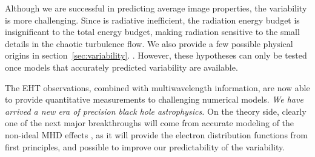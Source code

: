 Although we are successful in predicting average image properties, the
variability is more challenging.
Since \sgra is radiative inefficient, the radiation energy budget is
insignificant to the total energy budget, making radiation sensitive
to the small details in the chaotic turbulence flow.
We also provide a few possible physical origins in
section~\ref{sec:variability}. 
.
However, these hypotheses can only be tested once models that
accurately predicted variability are available.

The EHT observations, combined with multiwavelength information, are
now able to provide quantitative measurements to challenging numerical
models.
\emph{We have arrived a new era of precision black hole astrophysics.}
On the theory side, clearly one of the next major breakthroughs will
come from accurate modeling of the non-ideal MHD effects , as it will
provide the electron distribution functions from first principles, and
possible to improve our predictability of the variability.